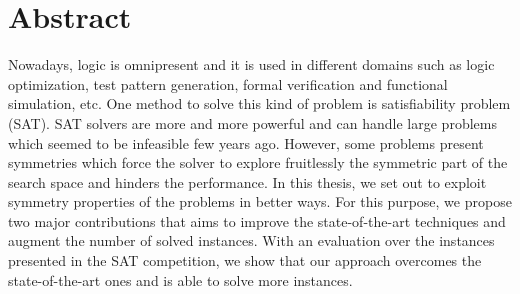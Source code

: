 
\chapter*{Abstract}
Nowadays, logic is omnipresent and it is used in different domains such as logic optimization, test pattern generation, formal verification and functional simulation, etc.
One method to solve this kind of problem is satisfiability problem (SAT).
SAT solvers are more and more powerful and can handle large problems which seemed to be infeasible 
few years ago. However, some problems present symmetries which force the solver to explore fruitlessly
the symmetric part of the search space and hinders the performance. 
In this thesis, we set out to exploit symmetry properties of the problems in better ways.
For this purpose, we propose two major contributions that aims to improve the state-of-the-art techniques and augment the number of solved instances. With an evaluation over the instances presented in the SAT competition, we show that our approach overcomes the state-of-the-art ones and is able to solve more instances. 